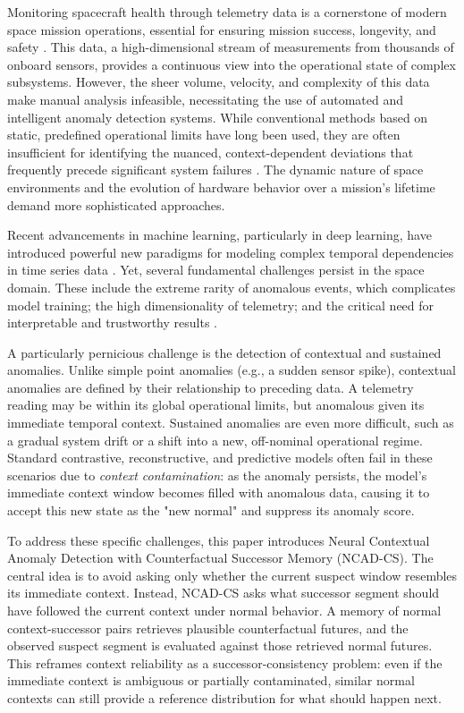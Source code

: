 \documentclass[journal]{IEEEtran}
\begin{document}
Monitoring spacecraft health through telemetry data is a cornerstone of modern space mission operations, essential for ensuring mission success, longevity, and safety \cite{meng2019spacecraft}. This data, a high-dimensional stream of measurements from thousands of onboard sensors, provides a continuous view into the operational state of complex subsystems. However, the sheer volume, velocity, and complexity of this data make manual analysis infeasible, necessitating the use of automated and intelligent anomaly detection systems. While conventional methods based on static, predefined operational limits have long been used, they are often insufficient for identifying the nuanced, context-dependent deviations that frequently precede significant system failures \cite{chandola2009anomaly}. The dynamic nature of space environments and the evolution of hardware behavior over a mission's lifetime demand more sophisticated approaches.

Recent advancements in machine learning, particularly in deep learning, have introduced powerful new paradigms for modeling complex temporal dependencies in time series data \cite{chalapathy2019deep}. Yet, several fundamental challenges persist in the space domain. These include the extreme rarity of anomalous events, which complicates model training; the high dimensionality of telemetry; and the critical need for interpretable and trustworthy results \cite{cuellar2024explainable}.

A particularly pernicious challenge is the detection of contextual and sustained anomalies. Unlike simple point anomalies (e.g., a sudden sensor spike), contextual anomalies are defined by their relationship to preceding data. A telemetry reading may be within its global operational limits, but anomalous given its immediate temporal context. Sustained anomalies are even more difficult, such as a gradual system drift or a shift into a new, off-nominal operational regime. Standard contrastive, reconstructive, and predictive models often fail in these scenarios due to \textit{context contamination}: as the anomaly persists, the model's immediate context window becomes filled with anomalous data, causing it to accept this new state as the "new normal" and suppress its anomaly score.

To address these specific challenges, this paper introduces Neural Contextual Anomaly Detection with Counterfactual Successor Memory (NCAD-CS). The central idea is to avoid asking only whether the current suspect window resembles its immediate context. Instead, NCAD-CS asks what successor segment should have followed the current context under normal behavior. A memory of normal context-successor pairs retrieves plausible counterfactual futures, and the observed suspect segment is evaluated against those retrieved normal futures. This reframes context reliability as a successor-consistency problem: even if the immediate context is ambiguous or partially contaminated, similar normal contexts can still provide a reference distribution for what should happen next.
\end{document}
